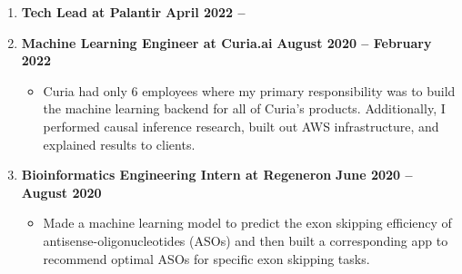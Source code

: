 \documentclass[letterpaper,11pt]{article}
\newcommand{\resitem}[1]{\item #1 \vspace{-2pt}}
\begin{document}
\vspace{-6pt}
\begin{enumerate}[leftmargin=10pt]
	\item[] \textbf{Tech Lead at \textcolor{myGreen}{Palantir}} \cftdotfill{\cftdotsep} \textbf{\textcolor{myGreen}{April 2022 --}}\\

	\item[] \textbf{Machine Learning Engineer at \textcolor{myGreen}{Curia.ai}} \cftdotfill{\cftdotsep} \textbf{\textcolor{myGreen}{August 2020 --} February 2022}\\
	\vspace{-4pt}	
	\begin{itemize}
		\resitem{Curia had only 6 employees where my primary responsibility was to build the machine learning backend for all of Curia's products. Additionally, I performed causal inference research, built out AWS infrastructure, and explained results to clients.}
	\end{itemize}

	 
	\item[] \textbf{Bioinformatics Engineering Intern at \textcolor{myGreen}{Regeneron}} \cftdotfill{\cftdotsep} \textbf{\textcolor{myGreen}{June 2020 --} August 2020}\\
	\vspace{-4pt}	
	\begin{itemize}
		\resitem{Made a machine learning model to predict the exon skipping efficiency of antisense-oligonucleotides (ASOs) and then built a corresponding app to recommend optimal ASOs for specific exon skipping tasks.}	
	\end{itemize}


\end{enumerate}
\end{document}
